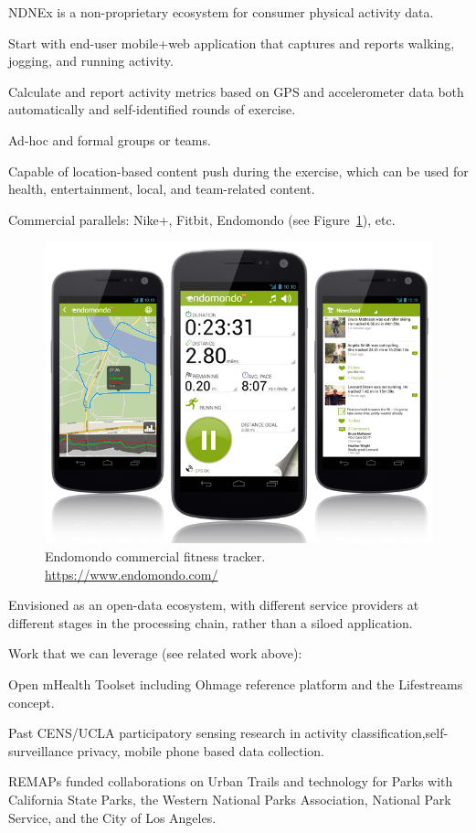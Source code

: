 NDNEx is a non-proprietary ecosystem for consumer physical activity data. 

Start with end-user mobile+web application that captures and reports walking, jogging, and running activity.

Calculate and report activity metrics based on GPS and accelerometer data  both automatically and self-identified rounds of exercise.  

Ad-hoc and formal groups or teams. 

Capable of location-based content push during the exercise, which can be used for health, entertainment, local, and team-related content. 

Commercial parallels:  Nike+, Fitbit, Endomondo (see Figure~\ref{fig:endomondo}), etc. 

\begin{figure}
\begin{center}
\includegraphics[width=.6\textwidth]{figures/endomondo}
\caption{Endomondo commercial fitness tracker. \protect\url{https://www.endomondo.com/}}
\label{fig:endomondo}
\end{center}
\end{figure}


Envisioned as an open-data ecosystem, with different service providers at different stages in the processing chain, rather than a siloed application.

Work that we can leverage (see related work above): 

Open mHealth Toolset  including Ohmage reference platform and the Lifestreams concept. 

Past CENS/UCLA participatory sensing research in activity classification,self-surveillance privacy, mobile phone based data collection.

REMAPs funded collaborations on Urban Trails and technology for Parks with California State Parks, the Western National Parks Association, National Park Service, and the City of Los Angeles. 

